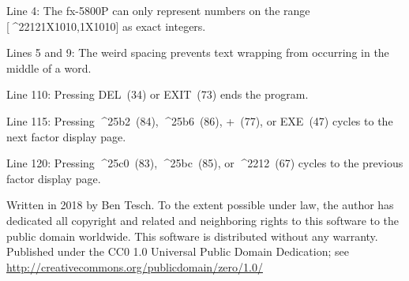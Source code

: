 \documentclass[11pt,letterpaper]{article}
\newcommand{\MINUS}{^^^^2212}
\newcommand{\EXPTEN}{{\scriptsize X10}}
\newcommand{\UPTRIANG}{^^^^25b2}
\newcommand{\RIGHTTRIANG}{^^^^25b6}
\newcommand{\DOWNTRIANG}{^^^^25bc}
\newcommand{\LEFTTRIANG}{^^^^25c0}
\begin{document}
\begin{multicols}{2}
Line 4: The fx-5800P can only represent numbers on the range [\MINUS 1\EXPTEN 10,1\EXPTEN 10] as exact integers.

Lines 5 and 9: The weird spacing prevents text wrapping from occurring in the middle of a word.

Line 110: Pressing DEL~(34) or EXIT~(73) ends the program.

Line 115: Pressing \UPTRIANG~(84), \RIGHTTRIANG~(86), +~(77), or EXE~(47) cycles to the next factor display page.

Line 120: Pressing \LEFTTRIANG~(83), \DOWNTRIANG~(85), or \MINUS~(67) cycles to the previous factor display page.

\vspace{3ex}
\scriptsize{Written in 2018 by Ben Tesch. To the extent possible under law, the author has dedicated all copyright and related and neighboring rights to this software to the public domain worldwide. This software is distributed  without any warranty. Published under the CC0 1.0 Universal Public Domain Dedication; see\\
\url{http://creativecommons.org/publicdomain/zero/1.0/}} 
\end{multicols}
\end{document}
